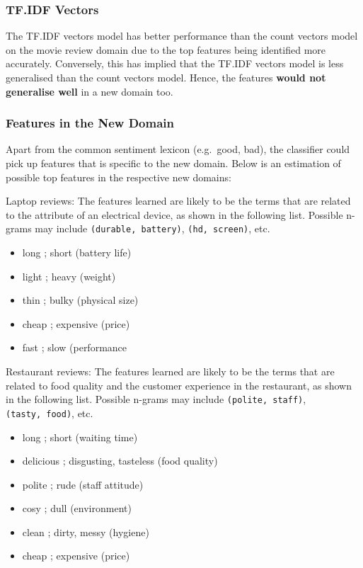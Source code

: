 \documentclass[11pt]{article}
\providecommand{\tightlist}{%
      \setlength{\itemsep}{0pt}\setlength{\parskip}{0pt}}
\begin{document}
\hypertarget{tf.idf-vectors}{%
\subsubsection{TF.IDF Vectors}\label{tf.idf-vectors}}

The TF.IDF vectors model has better performance than the count vectors
model on the movie review domain due to the top features being
identified more accurately. Conversely, this has implied that the TF.IDF
vectors model is less generalised than the count vectors model. Hence,
the features \textbf{would not generalise well} in a new domain too.

\hypertarget{features-in-the-new-domain}{%
\subsubsection{Features in the New
Domain}\label{features-in-the-new-domain}}

Apart from the common sentiment lexicon (e.g.~good, bad), the classifier
could pick up features that is specific to the new domain. Below is an
estimation of possible top features in the respective new domains:

Laptop reviews: The features learned are likely to be the terms that are
related to the attribute of an electrical device, as shown in the
following list. Possible n-grams may include
\texttt{(durable,\ battery)}, \texttt{(hd,\ screen)}, etc.

\begin{itemize}
\tightlist
\item
  long ; short (battery life)
\item
  light ; heavy (weight)
\item
  thin ; bulky (physical size)
\item
  cheap ; expensive (price)
\item
  fast ; slow (performance
\end{itemize}

Restaurant reviews: The features learned are likely to be the terms that
are related to food quality and the customer experience in the
restaurant, as shown in the following list. Possible n-grams may include
\texttt{(polite,\ staff)}, \texttt{(tasty,\ food)}, etc.

\begin{itemize}
\tightlist
\item
  long ; short (waiting time)
\item
  delicious ; disgusting, tasteless (food quality)
\item
  polite ; rude (staff attitude)
\item
  cosy ; dull (environment)
\item
  clean ; dirty, messy (hygiene)
\item
  cheap ; expensive (price)
\end{itemize}
\end{document}
